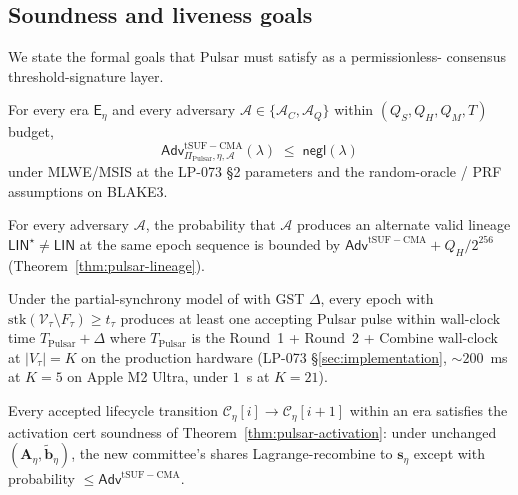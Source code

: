 \subsection{Soundness and liveness goals}
\label{sec:formal-model:goals}

We state the formal goals that Pulsar must satisfy as a permissionless-
consensus threshold-signature layer.

\begin{definition}
\label{def:soundness}
For every era $\mathsf{E}_\eta$ and every adversary
$\mathcal{A} \in \{\mathcal{A}_C, \mathcal{A}_Q\}$ within
$(Q_S, Q_H, Q_M, T)$ budget,
\[
  \mathsf{Adv}^{\mathrm{tSUF-CMA}}_{\Pi_{\mathrm{Pulsar}}, \eta, \mathcal{A}}(\lambda)
  \;\leq\; \mathsf{negl}(\lambda)
\]
under MLWE/MSIS at the LP-073 \S2 parameters and the random-oracle /
PRF assumptions on BLAKE3.
\end{definition}

\begin{definition}
\label{def:lineage-soundness}
For every adversary $\mathcal{A}$, the probability that $\mathcal{A}$
produces an alternate valid lineage $\mathsf{LIN}^\star \neq
\mathsf{LIN}$ at the same epoch sequence is bounded by
$\mathsf{Adv}^{\mathrm{tSUF-CMA}} + Q_H / 2^{256}$
(Theorem~\ref{thm:pulsar-lineage}).
\end{definition}

\begin{definition}
\label{def:liveness}
Under the partial-synchrony model of \cite{garaybackbone} with
GST $\Delta$, every epoch with $\mathrm{stk}(\mathcal{V}_\tau \setminus
F_\tau) \geq t_\tau$ produces at least one accepting Pulsar pulse
within wall-clock time $T_{\mathrm{Pulsar}} + \Delta$ where
$T_{\mathrm{Pulsar}}$ is the Round~1 + Round~2 + Combine wall-clock at
$|V_\tau| = K$ on the production hardware (LP-073
\S\ref{sec:implementation}, $\sim 200$~ms at $K = 5$ on Apple M2 Ultra,
under $1$~s at $K = 21$).
\end{definition}

\begin{definition}
\label{def:activation-soundness}
Every accepted lifecycle transition $\mathcal{C}_\eta[i] \to
\mathcal{C}_\eta[i+1]$ within an era satisfies the activation cert
soundness of Theorem~\ref{thm:pulsar-activation}: under unchanged
$(\mathbf{A}_\eta, \tilde{\mathbf{b}}_\eta)$, the new committee's
shares Lagrange-recombine to $\mathbf{s}_\eta$ except with
probability $\leq \mathsf{Adv}^{\mathrm{tSUF-CMA}}$.
\end{definition}

